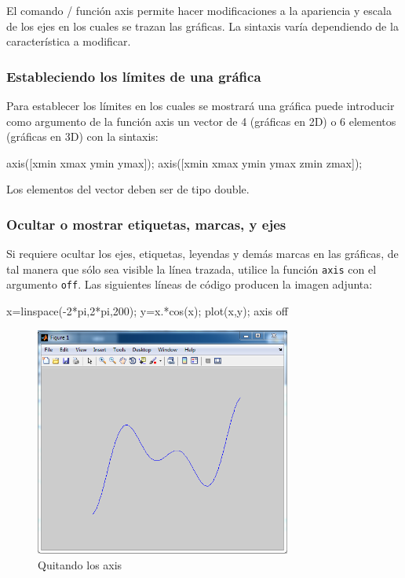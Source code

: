 El comando / función axis permite hacer modificaciones a la apariencia y
escala de los ejes en los cuales se trazan las gráficas. La sintaxis
varía dependiendo de la característica a modificar.

\subsubsection{Estableciendo los límites de una gráfica}

Para establecer los límites en los cuales se mostrará una gráfica puede
introducir como argumento de la función axis un vector de 4 (gráficas en
2D) o 6 elementos (gráficas en 3D) con la sintaxis:

\begin{matlab}
axis([xmin xmax ymin ymax]); %
axis([xmin xmax ymin ymax zmin zmax]); %
\end{matlab}

Los elementos del vector deben ser de tipo double.

\subsubsection{Ocultar o mostrar etiquetas, marcas, y ejes}

Si requiere ocultar los ejes, etiquetas, leyendas y demás marcas en las
gráficas, de tal manera que sólo sea visible la línea trazada, utilice
la función \texttt{axis} con el argumento \texttt{off}. Las siguientes
líneas de código producen la imagen adjunta:

\begin{matlab}
x=linspace(-2*pi,2*pi,200);
y=x.*cos(x);
plot(x,y);
axis off
\end{matlab}

\begin{figure}[htbp]
    \centering
    \includegraphics[width=0.75\textwidth]{images/ch4/img_4_5.png}
    \caption{Quitando los axis}
    \label{fig:img_4_5}
\end{figure}

